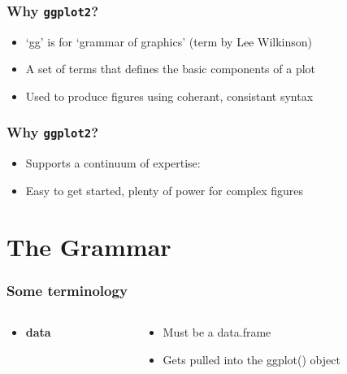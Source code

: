 \documentclass{beamer}\usepackage[]{graphicx}\usepackage[]{color}
\begin{document}

\begin{frame}[fragile]
\frametitle{Why \texttt{ggplot2}?}
\begin{itemize}
\item `gg' is for `grammar of graphics' (term by Lee Wilkinson)\\
\item A set of terms that defines the basic components of a plot\\
\item Used to produce figures using coherant, consistant syntax\\
\end{itemize}
\end{frame}


\begin{frame}[fragile]
\frametitle{Why \texttt{ggplot2}?}
\begin{itemize}
\item Supports a continuum of expertise:
\item Easy to get started, plenty of power for complex figures 
\end{itemize}
\end{frame}


\section*{The Grammar}
\frame{\sectionpage}


\begin{frame}[fragile]
\frametitle{Some terminology}
\begin{columns}[t]

\begin{column}[T]{3cm}
\begin{itemize}
    \item \textbf{data}
\end{itemize}
\end{column}

\begin{column}[T]{8cm}
\begin{itemize}
    \item Must be a data.frame
    \item Gets pulled into the ggplot() object
\end{itemize}
\end{column}

\end{columns}
\end{frame}
\end{document}
